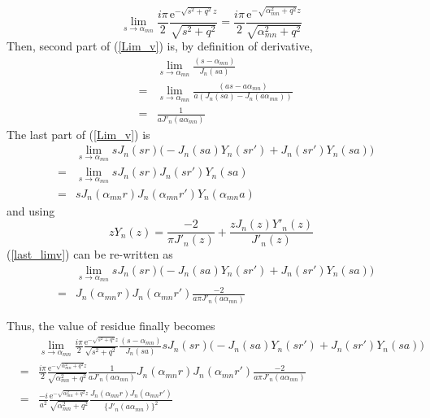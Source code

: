 \documentclass{article}
\begin{document}
\begin{equation}
    \lim_{s \to \alpha_{mn}}\frac{i\pi}{2}
        \frac{\mathrm{e}^{-\sqrt{s^2 + q^2} z}}{\sqrt{s^2+q^2}}
  = \frac{i\pi}{2}
  \frac{\mathrm{e}^{-\sqrt{\alpha_{mn}^2 + q^2} z}}{\sqrt{\alpha_{mn}^2+q^2}}
\end{equation}
Then, second part of (\ref{Lim_v}) is, by definition of derivative, 
\begin{eqnarray}
    & & \lim_{s \to \alpha_{mn}} \frac{(s - \alpha_{mn})}{J_n(sa)} \nonumber \\
    &=& \lim_{s \to \alpha_{mn}}
        \frac{(as - a\alpha_{mn})}{a(J_n(sa) - J_n(a\alpha_{mn}))} \nonumber \\
    &=& \frac{1}{aJ'_n(a\alpha_{mn})}
\end{eqnarray}
The last part of (\ref{Lim_v}) is
\begin{eqnarray}
    & & \lim_{s \to \alpha_{mn}}sJ_n(sr)\Big(-J_n(sa)Y_n(sr') + J_n(sr')Y_n(sa)\Big) \nonumber \\
    &=& \lim_{s \to \alpha_{mn}}sJ_n(sr)J_n(sr')Y_n(sa) \nonumber \\
    &=& sJ_n(\alpha_{mn}r)J_n(\alpha_{mn}r')Y_n(\alpha_{mn}a) \label{last_limv}
\end{eqnarray}
and using
\begin{equation}
    zY_n(z) = \frac{-2}{\pi J'_n(z)} + \frac{zJ_n(z)Y'_n(z)}{J'_n(z)}
\end{equation}
(\ref{last_limv}) can be re-written as
\begin{eqnarray}
    & & \lim_{s \to \alpha_{mn}}sJ_n(sr)\Big(-J_n(sa)Y_n(sr') + J_n(sr')Y_n(sa)\Big) \nonumber \\
    &=& J_n(\alpha_{mn}r)J_n(\alpha_{mn}r')\frac{-2}{a\pi J'_n(a\alpha_{mn})}
\end{eqnarray}

Thus, the value of residue finally becomes
\begin{eqnarray}
    & & \lim_{s \to \alpha_{mn}}\frac{i\pi}{2}
        \frac{\mathrm{e}^{-\sqrt{s^2 + q^2} z}}{\sqrt{s^2+q^2}}
        \frac{(s - \alpha_{mn})}{J_n(sa)}sJ_n(sr)
        \Big(-J_n(sa)Y_n(sr') + J_n(sr')Y_n(sa)\Big) \nonumber \\
    &=& \frac{i\pi}{2}\frac{\mathrm{e}^{-\sqrt{\alpha_{mn}^2 + q^2} z}}
                           {\sqrt{\alpha_{mn}^2+q^2}}
        \frac{1}{aJ'_n(a\alpha_{mn})}
        J_n(\alpha_{mn}r)J_n(\alpha_{mn}r')
        \frac{-2}{a\pi J'_n(a\alpha_{mn})} \nonumber \\
    &=& \frac{-i}{a^2}\frac{\mathrm{e}^{-\sqrt{\alpha_{mn}^2 + q^2} z}}
                         {\sqrt{\alpha_{mn}^2+q^2}}
        \frac{J_n(\alpha_{mn}r)J_n(\alpha_{mn}r')}{\{J'_n(a\alpha_{mn})\}^2}
\end{eqnarray}
\end{document}
